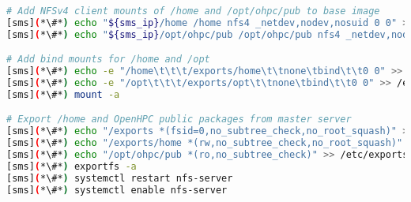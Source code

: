 \begin{lstlisting}[language=bash,keywords={}]
# Add NFSv4 client mounts of /home and /opt/ohpc/pub to base image
[sms](*\#*) echo "${sms_ip}/home /home nfs4 _netdev,nodev,nosuid 0 0" >> $CHROOT/etc/fstab
[sms](*\#*) echo "${sms_ip}/opt/ohpc/pub /opt/ohpc/pub nfs4 _netdev,nodev 0 0" >> $CHROOT/etc/fstab

# Add bind mounts for /home and /opt
[sms](*\#*) echo -e "/home\t\t\t/exports/home\t\tnone\tbind\t\t0 0" >> /etc/fstab
[sms](*\#*) echo -e "/opt\t\t\t/exports/opt\t\tnone\tbind\t\t0 0" >> /etc/fstab
[sms](*\#*) mount -a

# Export /home and OpenHPC public packages from master server
[sms](*\#*) echo "/exports *(fsid=0,no_subtree_check,no_root_squash)" >> /etc/exports.d/ohpc.exports
[sms](*\#*) echo "/exports/home *(rw,no_subtree_check,no_root_squash)" >> /etc/exports.d/ohpc.exports
[sms](*\#*) echo "/opt/ohpc/pub *(ro,no_subtree_check)" >> /etc/exports.d/ohpc.exports
[sms](*\#*) exportfs -a
[sms](*\#*) systemctl restart nfs-server
[sms](*\#*) systemctl enable nfs-server
\end{lstlisting}
